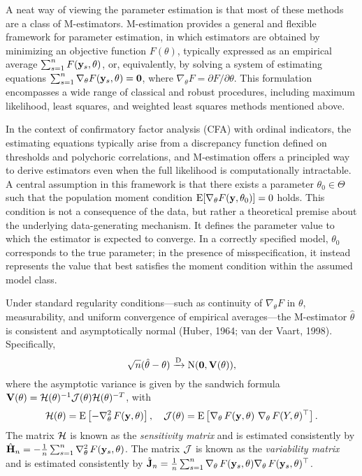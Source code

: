 \documentclass[
  letterpaper,
  DIV=11,
  numbers=noendperiod]{scrartcl}
\begin{document}
A neat way of viewing the parameter estimation is that most of these
methods are a class of M-estimators. M-estimation provides a general and
flexible framework for parameter estimation, in which estimators are
obtained by minimizing an objective function \(F(\theta)\), typically
expressed as an empirical average \(\sum_{s=1}^n F({\mathbf y}_s, \theta)\), or,
equivalently, by solving a system of estimating equations
\(\sum_{s=1}^n \nabla_\theta F({\mathbf y}_s, \theta) = {\mathbf 0}\), where
\(\nabla_\theta F = \partial F / \partial \theta\). This formulation
encompasses a wide range of classical and robust procedures, including
maximum likelihood, least squares, and weighted least squares methods
mentioned above.

In the context of confirmatory factor analysis (CFA) with ordinal
indicators, the estimating equations typically arise from a discrepancy
function defined on thresholds and polychoric correlations, and
M-estimation offers a principled way to derive estimators even when the
full likelihood is computationally intractable. A central assumption in
this framework is that there exists a parameter \(\theta_0 \in \Theta\)
such that the population moment condition
\(\operatorname{E}[\nabla_\theta F({\mathbf y}, \theta_0)] = 0\) holds. This condition is not
a consequence of the data, but rather a theoretical premise about the
underlying data-generating mechanism. It defines the parameter value to
which the estimator is expected to converge. In a correctly specified
model, \(\theta_0\) corresponds to the true parameter; in the presence
of misspecification, it instead represents the value that best satisfies
the moment condition within the assumed model class.

Under standard regularity conditions---such as continuity of
\(\nabla_\theta F\) in \(\theta\), measurability, and uniform
convergence of empirical averages---the M-estimator \(\hat\theta\) is
consistent and asymptotically normal (Huber, 1964; van der Vaart, 1998).
Specifically, \[
\sqrt{n}(\hat\theta - \theta) \xrightarrow{\text D} \operatorname{N}({\mathbf 0}, {\mathbf V}(\theta)),
\] where the asymptotic variance is given by the sandwich formula
\({\mathbf V}(\theta) = {\mathcal H}(\theta)^{-1} {\mathcal J}(\theta) {\mathcal H}(\theta)^{-T}\), with \[
{\mathcal H}(\theta) = \operatorname{E} \left[ - \nabla_\theta^2 \, F({\mathbf y},\theta) \right], \quad
{\mathcal J}(\theta) = \operatorname{E} \left[ \nabla_\theta \,F({\mathbf y},\theta) \ \nabla_\theta \, F(Y,\theta) ^\top \right].
\] The matrix \({\mathcal H}\) is known as the \emph{sensitivity matrix} and is
estimated consistently by
\(\hat{{\mathbf H}}_n = -\frac{1}{n} \sum_{s=1}^n \nabla_\theta^2 \, F({\mathbf y}_s, \theta)\).
The matrix \({\mathcal J}\) is known as the \emph{variability matrix} and is
estimated consistently by
\(\hat{{\mathbf J}}_n = \frac{1}{n} \sum_{s=1}^n \nabla_\theta \, F({\mathbf y}_s, \theta) \nabla_\theta \, F({\mathbf y}_s, \theta)^\top\).
\end{document}

